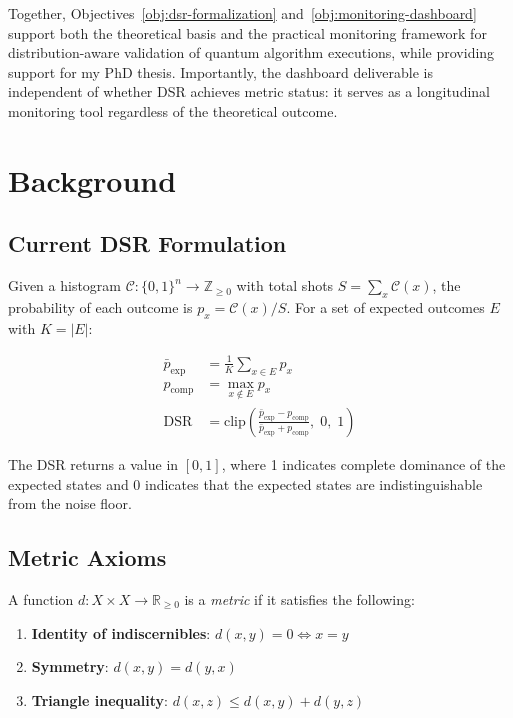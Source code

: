 \documentclass[11pt]{article}
\begin{document}
Together, Objectives~\ref{obj:dsr-formalization} and~\ref{obj:monitoring-dashboard} support both the theoretical basis and the practical monitoring framework for distribution-aware validation of quantum algorithm executions, while providing support for my PhD thesis. Importantly, the dashboard deliverable is independent of whether DSR achieves metric status: it serves as a longitudinal monitoring tool regardless of the theoretical outcome.

\section{Background}

\subsection{Current DSR Formulation}

Given a histogram $\mathcal{C} : \{0,1\}^n \to \mathbb{Z}_{\geq 0}$ with total shots $S = \sum_x \mathcal{C}(x)$, the probability of each outcome is $p_x = \mathcal{C}(x)/S$. For a set of expected outcomes $E$ with $K = |E|$:

\begin{align}
  \bar{p}_{\text{exp}} &= \frac{1}{K} \sum_{x \in E} p_x \label{eq:pexp}\\
  p_{\text{comp}} &= \max_{x \notin E} p_x \label{eq:pcomp}\\
  \text{DSR} &= \text{clip}\!\left(\frac{\bar{p}_{\text{exp}} - p_{\text{comp}}}{\bar{p}_{\text{exp}} + p_{\text{comp}}},\; 0,\; 1\right) \label{eq:dsr}
\end{align}

The DSR returns a value in $[0, 1]$, where 1 indicates complete dominance of the expected states and 0 indicates that the expected states are indistinguishable from the noise floor.

\subsection{Metric Axioms}

A function $d: X \times X \to \mathbb{R}_{\geq 0}$ is a \emph{metric} if it satisfies the following:
\begin{enumerate}[label=(\roman*)]
  \item \textbf{Identity of indiscernibles}: $d(x, y) = 0 \iff x = y$
  \item \textbf{Symmetry}: $d(x, y) = d(y, x)$
  \item \textbf{Triangle inequality}: $d(x, z) \leq d(x, y) + d(y, z)$
\end{enumerate}
\end{document}
